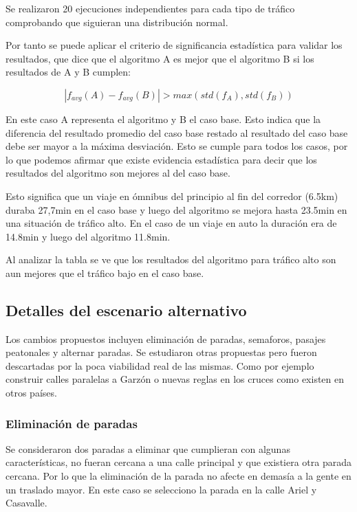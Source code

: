 Se realizaron 20 ejecuciones independientes para cada tipo de tráfico comprobando que siguieran una distribución normal.

Por tanto se puede aplicar el criterio de significancia estadística para validar los resultados, que dice que el
algoritmo A es mejor que el algoritmo B si los resultados de A y B cumplen:


\begin{equation}
\label{eq:funcion_significancia}
\left |f_{avg}(A) - f_{avg}(B)  \right | > max(std(f_A),std(f_B))
\end{equation}

En este caso A representa el algoritmo y B el caso base. Esto indica que la diferencia del resultado promedio del caso base restado al resultado del caso base debe ser mayor a la máxima desviación.
Esto se cumple para todos los casos, por lo que podemos afirmar que existe evidencia estadística para decir que los resultados del algoritmo son mejores al del caso base.


Esto significa que un viaje en ómnibus del principio al fin del corredor (6.5km) duraba 27,7min en el caso base y luego del algoritmo se mejora hasta 23.5min en una situación de tráfico alto. En el caso de un viaje en auto la duración era de 14.8min y luego del algoritmo 11.8min.

Al analizar la tabla se ve que los resultados del algoritmo para tráfico alto son aun mejores que el tráfico bajo en el caso base. 





\subsection{Detalles del escenario alternativo}
Los cambios propuestos incluyen eliminación de paradas, semaforos, pasajes peatonales y alternar paradas. Se estudiaron otras propuestas pero fueron descartadas por la poca viabilidad real de las mismas. Como por ejemplo construir calles paralelas a Garzón o nuevas reglas en los cruces como existen en otros países.




\subsubsection{Eliminación de paradas}
Se consideraron dos paradas a eliminar que cumplieran con algunas características, no fueran cercana a una calle principal y que existiera otra parada cercana. Por lo que la eliminación de la parada no afecte en demasía a la gente en un traslado mayor.
En este caso se selecciono la parada en la calle Ariel y Casavalle.



